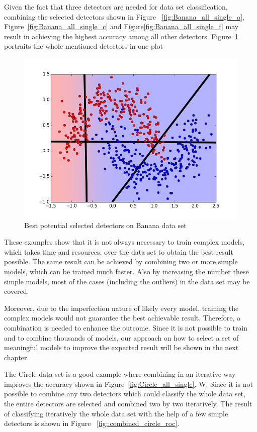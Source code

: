 Given the fact that three detectors are needed for data set classification, combining the selected detectors shown in Figure ~\ref{fig:Banana_all_single_a}, Figure~\ref{fig:Banana_all_single_c} and Figure\ref{fig:Banana_all_single_f} may result in achieving the highest accuracy among all other detectors. 
Figure~\ref{fig::combined_banana_roc} portraits the whole mentioned detectors in one plot


\begin{figure}[H]
\centering
\includegraphics[scale=0.6]{figs/Banana/9999999-combined_selected_before_combination}
\caption{Best potential selected detectors on Banana data set}
\label{fig::combined_banana_roc}
\end{figure}

These examples show that it is not always necessary to train complex models, which takes time and resources, over the data set to obtain the best result possible. The same result can be achieved by combining two or more simple models, which can be trained much faster. Also by increasing the number these simple models, most of the cases (including the outliers) in the data set may be covered. 

Moreover, due to the imperfection nature of likely every model, training the complex models would not guarantee the best achievable result. Therefore, a combination is needed to enhance the outcome. 
Since it is not possible to train and to combine thousands of models, our approach on how to select a set of meaningful models to improve the expected result will be shown in the next chapter.

The Circle data set is a good example where combining in an iterative way improves the accuracy shown in Figure~\ref{fig:Circle_all_single}.
W. Since it is not possible to combine any two detectors which could classify the whole data set, the entire detectors are selected and combined two by two iteratively.
The result of classifying iteratively the whole data set with the help of a few simple detectors is shown in Figure ~\ref{fig::combined_circle_roc}.


